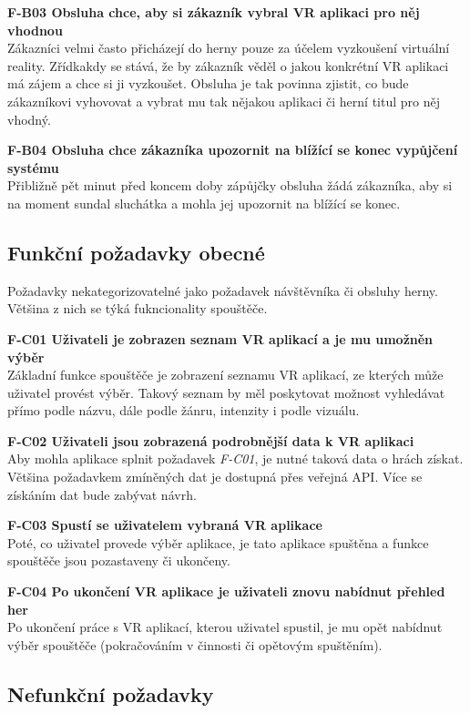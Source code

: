 \textbf{F-B03 Obsluha chce, aby si zákazník vybral VR aplikaci pro něj
vhodnou}\\
Zákazníci velmi často přicházejí do herny pouze za účelem vyzkoušení
virtuální reality. Zřídkakdy se stává, že by zákazník věděl o jakou
konkrétní VR aplikaci má zájem a chce si ji vyzkoušet. Obsluha je tak
povinna zjistit, co bude zákazníkovi vyhovovat a vybrat mu tak nějakou
aplikaci či herní titul pro něj vhodný.

\textbf{F-B04 Obsluha chce zákazníka upozornit na blížící se konec
vypůjčení systému}\\
Přibližně pět minut před koncem doby zápůjčky obsluha žádá zákazníka,
aby si na moment sundal sluchátka a mohla jej upozornit na blížící se
konec.

\subsection{Funkční požadavky
obecné}\label{funkux10dnuxed-poux17eadavky-obecnuxe9}

Požadavky nekategorizovatelné jako požadavek návštěvníka či obsluhy
herny. Většina z nich se týká fukncionality spouštěče.

\textbf{F-C01 Uživateli je zobrazen seznam VR aplikací a je mu umožněn
výběr}\\
Základní funkce spouštěče je zobrazení seznamu VR aplikací, ze kterých
může uživatel provést výběr. Takový seznam by měl poskytovat možnost
vyhledávat přímo podle názvu, dále podle žánru, intenzity i podle
vizuálu.

\textbf{F-C02 Uživateli jsou zobrazená podrobnější data k VR aplikaci}\\
Aby mohla aplikace splnit požadavek \emph{F-C01}, je nutné taková data o
hrách získat. Většina požadavkem zmíněných dat je dostupná přes veřejná
API. Více se získáním dat bude zabývat návrh.

\textbf{F-C03 Spustí se uživatelem vybraná VR aplikace}\\
Poté, co uživatel provede výběr aplikace, je tato aplikace spuštěna a
funkce spouštěče jsou pozastaveny či ukončeny.

\textbf{F-C04 Po ukončení VR aplikace je uživateli znovu nabídnut
přehled her}\\
Po ukončení práce s VR aplikací, kterou uživatel spustil, je mu opět
nabídnut výběr spouštěče (pokračováním v činnosti či opětovým
spuštěním).

\subsection{Nefunkční požadavky}\label{nefunkux10dnuxed-poux17eadavky}

